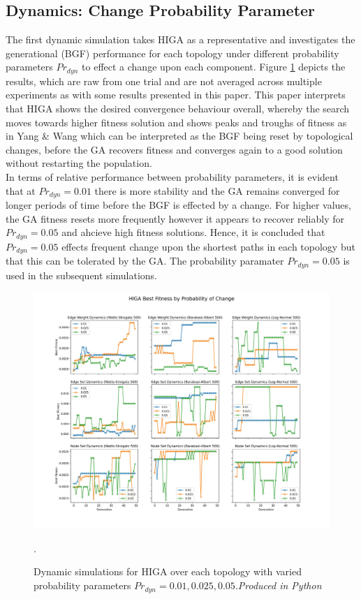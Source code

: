 \documentclass[
	a4paper, %
	10pt, %
	unnumberedsections, %
	twoside, %
]{LTJournalArticle}
\begin{document}
\subsection{Dynamics: Change Probability Parameter} 

The first dynamic simulation takes HIGA as a representative and investigates the generational (BGF) performance for each topology under different probability parameters \(Pr_{dyn}\) to effect a change upon each component. Figure \ref{fig:prob_dyn} depicts the results, which are raw from one trial and are not averaged across multiple experiments as with some results presented in this paper. This paper interprets that HIGA shows the desired convergence behaviour overall, whereby the search moves towards higher fitness solution and shows peaks and troughs of fitness as in Yang \& Wang \cite{yang:10} which can be interpreted as the BGF being reset by topological changes, before the GA recovers fitness and converges again to a good solution without restarting the population. \\

In terms of relative performance between probability parameters, it is evident that at \(Pr_{dyn} = 0.01\) there is more stability and the GA remains converged for longer periods of time before the BGF is effected by a change. For higher values, the GA fitness resets more frequently however it appears to recover reliably for \(Pr_{dyn} = 0.05\) and ahcieve high fitness solutions. Hence, it is concluded that \(Pr_{dyn} = 0.05\) effects frequent change upon the shortest paths in each topology but that this can be tolerated by the GA. The probability paramater \(Pr_{dyn} = 0.05\) is used in the subsequent simulations.  

\begin{figure}
	\includegraphics[width=\linewidth]{Figures/sims/dynamic/prob_dyn.jpg}
	\caption{Dynamic simulations for HIGA over each topology with varied probability parameters  \(Pr_{dyn} = 0.01, 0.025, 0.05\).\emph{Produced in Python}}. 
	\label{fig:prob_dyn}
\end{figure}
\end{document}
